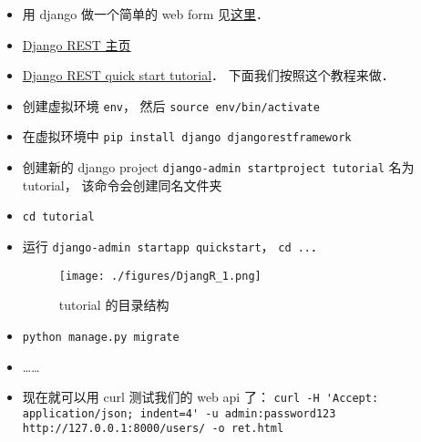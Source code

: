 
\begin{issues}
\issueDraft
\end{issues}

\begin{itemize}
\item 用 django 做一个简单的 web form 见\href{https://www.geeksforgeeks.org/how-to-create-a-form-using-django-forms/}{这里}．
\item \href{https://www.django-rest-framework.org/}{Django REST 主页}
\item \href{https://www.django-rest-framework.org/tutorial/quickstart/}{Django REST quick start tutorial}． 下面我们按照这个教程来做．
\item 创建虚拟环境 \verb|env|， 然后 \verb|source env/bin/activate|
\item 在虚拟环境中 \verb|pip install django djangorestframework|
\item 创建新的 django project \verb|django-admin startproject tutorial| 名为 tutorial， 该命令会创建同名文件夹
\item \verb|cd tutorial|
\item 运行 \verb|django-admin startapp quickstart|， \verb|cd ..|．
\begin{figure}[ht]
\centering
\texttt{[image: ./figures/DjangR\_1.png]}
\caption{tutorial 的目录结构} \label{DjangR_fig1}
\end{figure}
\item \verb|python manage.py migrate|
\item ……
\item 现在就可以用 curl 测试我们的 web api 了： \verb|curl -H 'Accept: application/json; indent=4' -u admin:password123 http://127.0.0.1:8000/users/ -o ret.html|
\end{itemize}
